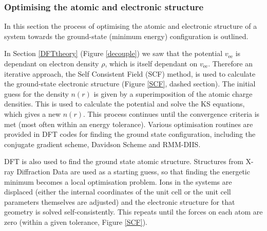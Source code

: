 \subsubsection{Optimising the atomic and electronic structure}

In this section the process of optimising the atomic and electronic structure of a system towards the ground-state (minimum energy) configuration is outlined. 

In Section \ref{DFTtheory} (Figure \ref{decouple}) we saw that the potential $v_\textrm{ee}$ is dependant on electron density $\rho$, which is itself dependant on $v_\textrm{ee
}$. Therefore an iterative approach, the Self Consistent Field (SCF) method, is used to calculate the ground-state electronic structure (Figure \ref{SCF}, dashed section). The initial guess for the density $n(r)$ is given by a superimposition of the atomic charge densities. This is used to calculate the potential and solve the KS equations, which gives a new $n(r)$. This process continues until the convergence criteria is met (most often within an energy tolerance). Various optimisation routines are provided in DFT codes for finding the ground state configuration, including the conjugate gradient scheme, Davidson Scheme and RMM-DIIS.

DFT is also used to find the ground state atomic structure. Structures from X-ray Diffraction Data are used as a starting guess, so that finding the energetic minimum becomes a local optimisation problem. Ions in the systems are displaced (either the internal coordinates of the unit cell or the unit cell parameters themselves are adjusted) and the electronic structure for that geometry is solved self-consistently. This repeats until the forces on each atom are zero (within a given tolerance, Figure \ref{SCF}). 

